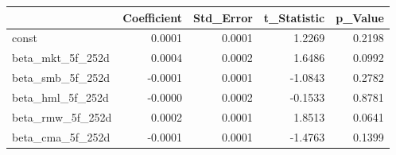 \begin{tabular}{lrrrr}
\toprule
 & Coefficient & Std\_Error & t\_Statistic & p\_Value \\
\midrule
const & 0.0001 & 0.0001 & 1.2269 & 0.2198 \\
beta\_mkt\_5f\_252d & 0.0004 & 0.0002 & 1.6486 & 0.0992 \\
beta\_smb\_5f\_252d & -0.0001 & 0.0001 & -1.0843 & 0.2782 \\
beta\_hml\_5f\_252d & -0.0000 & 0.0002 & -0.1533 & 0.8781 \\
beta\_rmw\_5f\_252d & 0.0002 & 0.0001 & 1.8513 & 0.0641 \\
beta\_cma\_5f\_252d & -0.0001 & 0.0001 & -1.4763 & 0.1399 \\
\bottomrule
\end{tabular}

